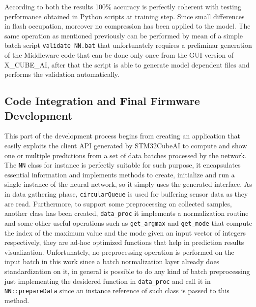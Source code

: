According to both the results 100\% accuracy is perfectly coherent with testing performance obtained in Python scripts at training step. Since small differences in flash occupation, moreover no compression has been applied to the model.\newline
The same operation as mentioned previously can be performed by mean of a simple batch script \texttt{validate_NN.bat} that unfortunately requires a preliminar generation of the Middleware code that can be done only once from the GUI version of X\_CUBE\_AI, after that the script is able to generate model dependent files and performs the validation automatically.   


\subsection{Code Integration and Final Firmware Development}

This part of the development process begins from creating an application that easily exploits the client API generated by STM32CubeAI to compute and show one or multiple predictions from a set of data batches processed by the network. The \texttt{NN} class for instance is perfectly suitable for such purpose, it encapsulates essential information and implements methods to create, initialize and run a single instance of the neural network, so it simply uses the generated interface. As in data gathering phase, \texttt{circularQueue} is used for buffering sensor data as they are read. Furthermore, to support some preprocessing on collected samples, another class has been created, \texttt{data_proc} it implements a normalization routine and some other useful operations such as  \texttt{get_argmax} and \texttt{get_mode} that compute the index of the maximum value and the mode given an input vector of integers respectively, they are ad-hoc optimized functions that help in prediction results visualization.
Unfortunately, no preprocessing operation is performed on the input batch in this work since a batch normalization layer already does standardization on it, in general is possible to do any kind of batch preprocessing just implementing the desidered function in \texttt{data_proc} and call it in \texttt{NN::prepareData} since an instance reference of such class is passed to this method.

